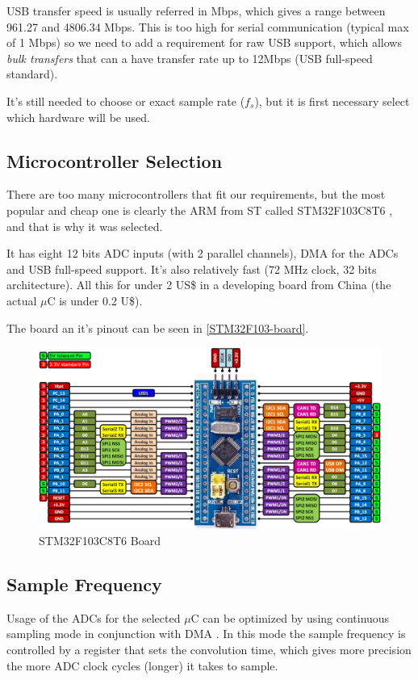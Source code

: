 USB transfer speed is usually referred in Mbps, which gives a range between
961.27 and 4806.34 Mbps. This is too high for serial communication (typical max of
1 Mbps) so we need to add a requirement for raw USB support, which allows \textit{bulk transfers}
that can a have transfer rate up to 12Mbps (USB full-speed standard).

It's still needed to choose or exact sample rate ($f_{s}$), but it is first necessary
select which hardware will be used.

\subsection{Microcontroller Selection}
There are too many microcontrollers that fit our requirements, but the most popular
and cheap one is clearly the ARM from ST called STM32F103C8T6 \cite{STM32F103},
and that is why it was selected. 

It has eight 12 bits ADC inputs (with 2 parallel channels), DMA for the ADCs and USB full-speed support. It's
also relatively fast (72 MHz clock, 32 bits architecture). All this for under 2 US\$
in a developing board from China (the actual $\mu$C is under 0.2 U\$). 

The board an it's pinout can be seen in \autoref{STM32F103-board}.

\begin{figure}[htb]
  \centering
  \caption{STM32F103C8T6 Board}
  \label{STM32F103-board}
  \includegraphics[scale=0.3]{images/STM32F103-board}
\end{figure}

\subsection{Sample Frequency}
\label{firmware-sample-frequency}
Usage of the ADCs for the selected $\mu$C can be optimized by using continuous sampling
mode in conjunction with DMA \cite[ch. 11]{STM32F103}. In this mode the sample frequency is controlled by a register
that sets the convolution time, which gives more precision the more ADC clock
cycles (longer) it takes to sample.

